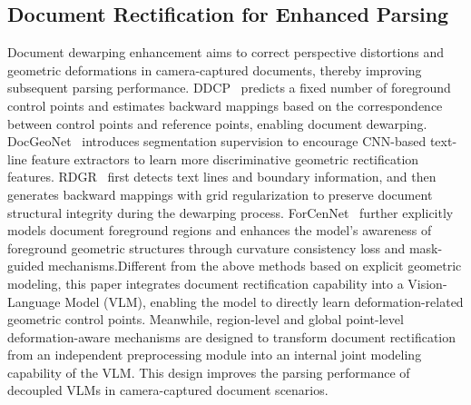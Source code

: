 \documentclass{fairmeta}
\begin{document}
\subsection{Document Rectification for Enhanced Parsing}
Document dewarping enhancement aims to correct perspective distortions and geometric deformations in camera-captured documents, thereby improving subsequent parsing performance. DDCP~\cite{xie2021document} predicts a fixed number of foreground control points and estimates backward mappings based on the correspondence between control points and reference points, enabling document dewarping. DocGeoNet~\cite{feng2022geometric} introduces segmentation supervision to encourage CNN-based text-line feature extractors to learn more discriminative geometric rectification features. RDGR~\cite{jiang2022revisiting} first detects text lines and boundary information, and then generates backward mappings with grid regularization to preserve document structural integrity during the dewarping process. ForCenNet~\cite{cai2025forcennet} further explicitly models document foreground regions and enhances the model's awareness of foreground geometric structures through curvature consistency loss and mask-guided mechanisms.Different from the above methods based on explicit geometric modeling, this paper integrates document rectification capability into a Vision-Language Model (VLM), enabling the model to directly learn deformation-related geometric control points. Meanwhile, region-level and global point-level deformation-aware mechanisms are designed to transform document rectification from an independent preprocessing module into an internal joint modeling capability of the VLM. This design improves the parsing performance of decoupled VLMs in camera-captured document scenarios.
\end{document}

